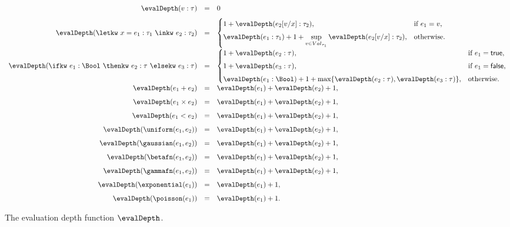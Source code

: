 \begin{figure}
  \small
  \[
  \begin{array}{rcl}
  \evalDepth(v : \tau)
  &=&
  0
  \\[0.75em]

  \evalDepth(\letkw\ x = e_1 : \tau_1\ \inkw\ e_2 : \tau_2)
  &=&
  \begin{cases}
    1 + \evalDepth(e_2[v/x] : \tau_2),
      & \text{if } e_1 = v, \\[0.4em]
    \evalDepth(e_1 : \tau_1)
    + 1
    + \displaystyle\sup_{v \in Val_{\tau_1}}
      \evalDepth(e_2[v/x] : \tau_2),
      & \text{otherwise.}
  \end{cases}
  \\[1.25em]

  \evalDepth(\ifkw\ e_1 : \Bool\ \thenkw\ e_2 : \tau\ \elsekw\ e_3 : \tau)
  &=&
  \begin{cases}
    1 + \evalDepth(e_2 : \tau),
      & \text{if } e_1 = \mathsf{true}, \\[0.4em]
    1 + \evalDepth(e_3 : \tau),
      & \text{if } e_1 = \mathsf{false}, \\[0.4em]
    \evalDepth(e_1 : \Bool)
    + 1
    + \max\{\evalDepth(e_2 : \tau), \evalDepth(e_3 : \tau)\},
      & \text{otherwise.}
  \end{cases}
  \\[1.25em]

  \evalDepth(e_1 + e_2)
  &=&
  \evalDepth(e_1) + \evalDepth(e_2) + 1,
  \\[0.75em]

  \evalDepth(e_1 \times e_2)
  &=&
  \evalDepth(e_1) + \evalDepth(e_2) + 1,
  \\[0.75em]

  \evalDepth(e_1 < e_2)
  &=&
  \evalDepth(e_1) + \evalDepth(e_2) + 1,
  \\[0.75em]

  \evalDepth(\uniform(e_1,e_2))
  &=&
  \evalDepth(e_1) + \evalDepth(e_2) + 1,
  \\[0.75em]

  \evalDepth(\gaussian(e_1,e_2))
  &=&
  \evalDepth(e_1) + \evalDepth(e_2) + 1,
  \\[0.75em]

  \evalDepth(\betafn(e_1,e_2))
  &=&
  \evalDepth(e_1) + \evalDepth(e_2) + 1,
  \\[0.75em]

  \evalDepth(\gammafn(e_1,e_2))
  &=&
  \evalDepth(e_1) + \evalDepth(e_2) + 1,
  \\[0.75em]

  \evalDepth(\exponential(e_1))
  &=&
  \evalDepth(e_1) + 1,
  \\[0.75em]

  \evalDepth(\poisson(e_1))
  &=&
  \evalDepth(e_1) + 1.
  \end{array}
  \]
  \caption{The evaluation depth function $\evalDepth$.}
  \label{fig:eval-depth}
\end{figure}

